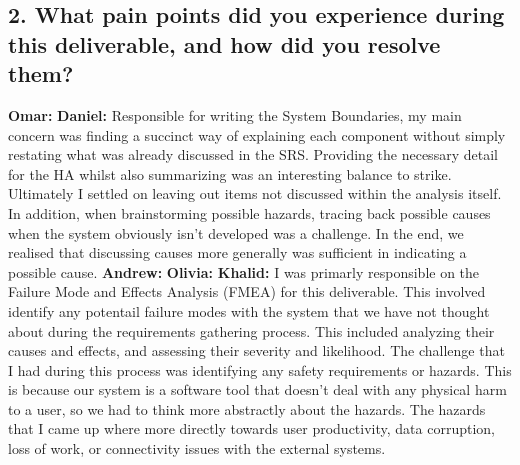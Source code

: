 \documentclass{article}
\begin{document}
\subsection*{2. What pain points did you experience during this deliverable, and how
did you resolve them?}
\bigskip
\textbf{Omar: }
\newline
\newline
\textbf{Daniel: } Responsible for writing the System Boundaries, my main concern was finding a succinct way of explaining each component without simply restating what was already discussed in the SRS. Providing the necessary detail for the HA whilst also summarizing was an interesting balance to strike. Ultimately I settled on leaving out items not discussed within the analysis itself. In addition, when brainstorming possible hazards, tracing back possible causes when the system obviously isn't developed was a challenge. In the end, we realised that discussing causes more generally was sufficient in indicating a possible cause.
\newline
\newline
\textbf{Andrew: }
\newline
\newline
\textbf{Olivia: }
\newline
\newline
\textbf{Khalid: } I was primarly responsible on the Failure Mode and Effects Analysis (FMEA) for this deliverable. This involved identify any potentail failure modes with the system that we have not thought about during the requirements gathering process. This included analyzing their causes and effects, and assessing their severity and likelihood. The challenge that I had during this process was identifying any safety requirements or hazards. This is because our system is a software tool that doesn't deal with any physical harm to a user, so we had to think more abstractly about the hazards. The hazards that I came up where more directly towards user productivity, data corruption, loss of work, or connectivity issues with the external systems.
\end{document}
